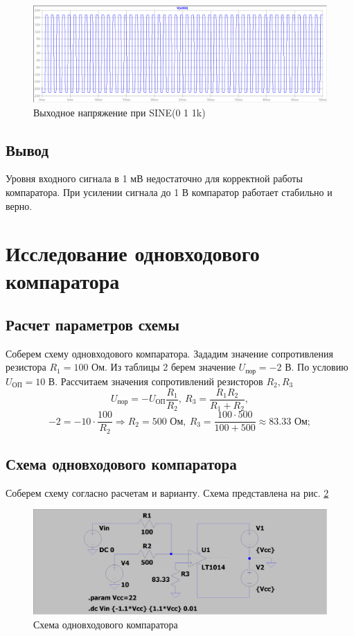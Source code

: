 \documentclass[a4paper, 12pt]{article}
\begin{document}
    \begin{figure}[H]
        \centering
        \includegraphics[scale=0.46]{3task_sine_out_1V_1kf.png}
        \captionsetup{skip=0pt}
        \caption{Выходное напряжение при SINE(0 1 1k)}
        \label{fig:3task_sine_out_1V_1kf}
    \end{figure}


    \subsection{Вывод}
    Уровня входного сигнала в 1 мВ недостаточно для корректной работы компаратора.
    При усилении сигнала до 1 В компаратор работает стабильно и верно.


    \section{Исследование одновходового компаратора}
    \subsection{Расчет параметров схемы}
    Соберем схему одновходового компаратора.
    Зададим значение сопротивления резистора $R_1=100$ Ом.
    Из таблицы 2 берем значение $U_\text{пор}=-2$ В. По условию $U_\text{ОП}=10$ В.
    Рассчитаем значения сопротивлений резисторов $R_2,R_3$
    $$
    U_\text{пор}=-U_\text{ОП}\dfrac{R_1}{R_2},\ R_3=\dfrac{R_1R_2}{R_1+R_2},
    $$
    $$
    -2=-10\cdot\dfrac{100}{R_2}\Rightarrow R_2=500\text{ Ом},\ R_3=\dfrac{100\cdot500}{100+500}\approx83.33\text{ Ом};
    $$


    \subsection{Схема одновходового компаратора}
    Соберем схему согласно расчетам и варианту. Схема представлена на рис. \ref{fig:scheme6}
    \begin{figure}[H]
        \centering
        \includegraphics[scale=0.22]{scheme6.png}
        \captionsetup{skip=0pt}
        \caption{Схема одновходового компаратора}
        \label{fig:scheme6}
    \end{figure}
\end{document}

